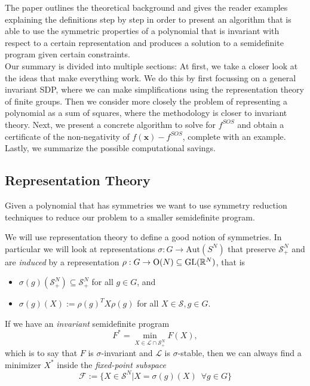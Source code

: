 \documentclass[]{article}
\begin{document}
The paper outlines the theoretical background and gives the reader examples explaining the definitions step by step in order to present an algorithm that is able to use the 
symmetric properties of a polynomial that is invariant with respect to a certain representation and produces a solution to a semidefinite program given certain constraints.\\


Our summary is divided into multiple sections: 
At first, we take a closer look at the ideas that make everything work. We do this by first focussing on a general invariant SDP, where we can make simplifications using the representation theory of finite groups. Then we consider more closely the problem of representing a polynomial as a sum of squares, where the methodology is closer to invariant theory.
Next, we present a concrete algorithm to solve for $f^{SOS}$ and obtain a certificate of the non-negativity of $f(\mathbf{x})-f^{SOS}$, complete with an example. Lastly, we summarize the possible computational savings.\\%

\subsection*{Representation Theory}

Given a polynomial that has symmetries we want to use symmetry reduction techniques to reduce our problem to a smaller semidefinite program.

We will use representation theory to define a good notion of symmetries. In particular we will look at representations
$\sigma:G\rightarrow \mathrm{Aut}(S^N)$ that preserve $\mathcal{S}_+^N$ and are \textit{induced} by a representation $\rho:G\rightarrow \mathrm{O}(N)\subseteq\mathrm{GL}(\mathbb R^N)$, 
that is 
\begin{itemize}
    \item $\sigma(g)(\mathcal{S}_+^N)\subseteq \mathcal{S}_+^N$ for all $g\in G$, and
    \item $\sigma(g)(X) := \rho(g)^TX\rho(g)$ for all $X\in \mathcal{S} , g\in G.$
\end{itemize}

If we have an \textit{invariant} semidefinite program 
\[
    F^\ast=\min_{X\in\mathcal{L}\cap\mathcal{S}_+^N}F(X),
\]
which is to say that $F$ is $\sigma$-invariant and $\mathcal{L}$ is $\sigma$-stable, then we can always find a minimizer $X^\ast$ inside the \textit{fixed-point subspace} 
\[
    \mathcal{F} := \{X\in\mathcal{S}^N | X= \sigma(g)(X)\,\,\, \forall g \in G\}
\]
\end{document}
